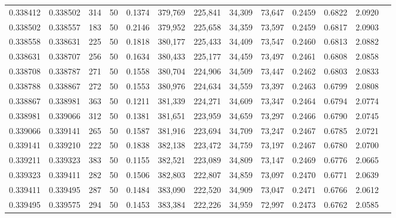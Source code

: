\begin{tabular}{rrrrrrrrrrrrr}
0.338412 & 0.338502 &   314 &  50 &                                     0.1374 & 379,769 & 225,841 &  34,309 &  73,647 & 0.2459 & 0.6822 & 2.0920 \\
0.338502 & 0.338557 &   183 &  50 &                                     0.2146 & 379,952 & 225,658 &  34,359 &  73,597 & 0.2459 & 0.6817 & 2.0903 \\
0.338558 & 0.338631 &   225 &  50 &                                     0.1818 & 380,177 & 225,433 &  34,409 &  73,547 & 0.2460 & 0.6813 & 2.0882 \\
0.338631 & 0.338707 &   256 &  50 &                                     0.1634 & 380,433 & 225,177 &  34,459 &  73,497 & 0.2461 & 0.6808 & 2.0858 \\
0.338708 & 0.338787 &   271 &  50 &                                     0.1558 & 380,704 & 224,906 &  34,509 &  73,447 & 0.2462 & 0.6803 & 2.0833 \\
0.338788 & 0.338867 &   272 &  50 &                                     0.1553 & 380,976 & 224,634 &  34,559 &  73,397 & 0.2463 & 0.6799 & 2.0808 \\
0.338867 & 0.338981 &   363 &  50 &                                     0.1211 & 381,339 & 224,271 &  34,609 &  73,347 & 0.2464 & 0.6794 & 2.0774 \\
0.338981 & 0.339066 &   312 &  50 &                                     0.1381 & 381,651 & 223,959 &  34,659 &  73,297 & 0.2466 & 0.6790 & 2.0745 \\
0.339066 & 0.339141 &   265 &  50 &                                     0.1587 & 381,916 & 223,694 &  34,709 &  73,247 & 0.2467 & 0.6785 & 2.0721 \\
0.339141 & 0.339210 &   222 &  50 &                                     0.1838 & 382,138 & 223,472 &  34,759 &  73,197 & 0.2467 & 0.6780 & 2.0700 \\
0.339211 & 0.339323 &   383 &  50 &                                     0.1155 & 382,521 & 223,089 &  34,809 &  73,147 & 0.2469 & 0.6776 & 2.0665 \\
0.339323 & 0.339411 &   282 &  50 &                                     0.1506 & 382,803 & 222,807 &  34,859 &  73,097 & 0.2470 & 0.6771 & 2.0639 \\
0.339411 & 0.339495 &   287 &  50 &                                     0.1484 & 383,090 & 222,520 &  34,909 &  73,047 & 0.2471 & 0.6766 & 2.0612 \\
0.339495 & 0.339575 &   294 &  50 &                                     0.1453 & 383,384 & 222,226 &  34,959 &  72,997 & 0.2473 & 0.6762 & 2.0585 \\

\end{tabular}
